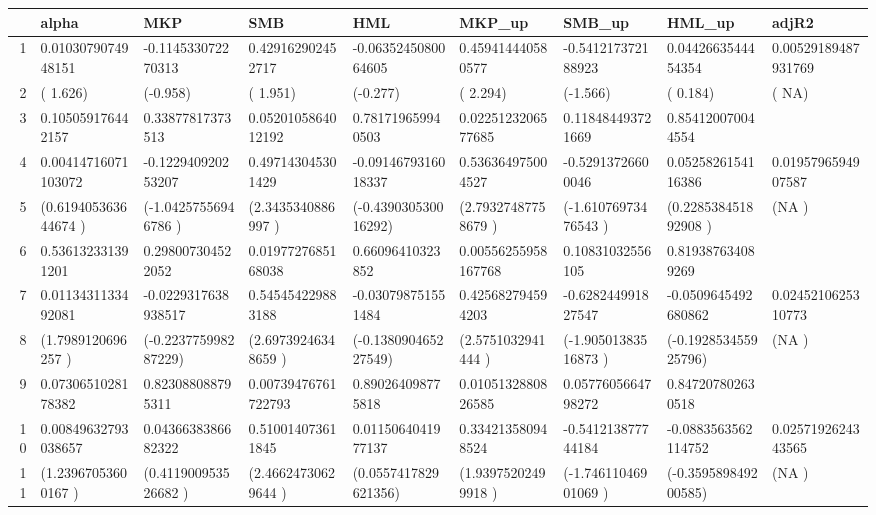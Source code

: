 \begin{table}[ht]
\centering
\begin{tabular}{rllllllll}
  \hline
 & alpha & MKP & SMB & HML & MKP\_up & SMB\_up & HML\_up & adjR2 \\ 
  \hline
1 & 0.0103079074948151 & -0.114533072270313 & 0.429162902452717 & -0.0635245080064605 & 0.459414440580577 & -0.541217372188923 & 0.0442663544454354 & 0.00529189487931769 \\ 
  2 & ( 1.626) & (-0.958) & ( 1.951) & (-0.277) & ( 2.294) & (-1.566) & ( 0.184) & (    NA) \\ 
  3 & 0.105059176442157 & 0.33877817373513 & 0.0520105864012192 & 0.781719659940503 & 0.0225123206577685 & 0.118484493721669 & 0.854120070044554 &  \\ 
  4 & 0.00414716071103072 & -0.122940920253207 & 0.497143045301429 & -0.0914679316018337 & 0.536364975004527 & -0.52913726600046 & 0.0525826154116386 & 0.0195796594907587 \\ 
  5 & (0.619405363644674 ) & (-1.04257556946786 ) & (2.3435340886997   ) & (-0.439030530016292) & (2.79327487758679  ) & (-1.61076973476543 ) & (0.228538451892908 ) & (NA                ) \\ 
  6 & 0.536132331391201 & 0.298007304522052 & 0.0197727685168038 & 0.66096410323852 & 0.00556255958167768 & 0.10831032556105 & 0.819387634089269 &  \\ 
  7 & 0.0113431133492081 & -0.0229317638938517 & 0.545454229883188 & -0.030798751551484 & 0.425682794594203 & -0.628244991827547 & -0.0509645492680862 & 0.0245210625310773 \\ 
  8 & (1.7989120696257   ) & (-0.223775998287229) & (2.69739246348659  ) & (-0.138090465227549) & (2.5751032941444   ) & (-1.90501383516873 ) & (-0.192853455925796) & (NA                ) \\ 
  9 & 0.0730651028178382 & 0.823088088795311 & 0.00739476761722793 & 0.890264098775818 & 0.0105132880826585 & 0.0577605664798272 & 0.847207802630518 &  \\ 
  10 & 0.00849632793038657 & 0.0436638386682322 & 0.510014073611845 & 0.0115064041977137 & 0.334213580948524 & -0.541213877744184 & -0.0883563562114752 & 0.0257192624343565 \\ 
  11 & (1.23967053600167  ) & (0.411900953526682 ) & (2.46624730629644  ) & (0.0557417829621356) & (1.93975202499918  ) & (-1.74611046901069 ) & (-0.359589849200585) & (NA                ) \\ 

\end{tabular}
\end{table}
